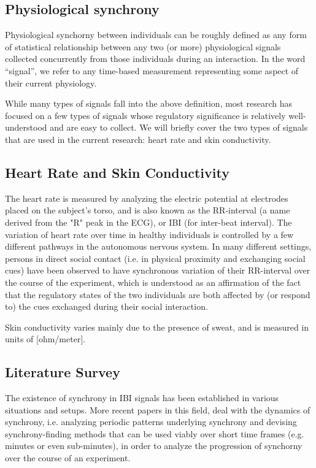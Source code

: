 \documentclass[a4paper, 11pt]{article}      %
\begin{document}
\subsection{Physiological synchrony}
Physiological synchorny between individuals can be roughly defined as any form of statistical relationship between any two (or more) physiological signals collected concurrently from those individuals during an interaction. In the word ``signal'', we refer to any time-based measurement representing some aspect of their current physiology.


While many types of signals fall into the above definition, most research has focused on a few types of signals whose regulatory significance is relatively well-understood and are easy to collect. We will briefly cover the two types of signals that are used in the current research: heart rate and skin conductivity.

\subsection{Heart Rate and Skin Conductivity}
The heart rate is measured by analyzing the electric potential at electrodes placed on the subject's torso, and is also known as the RR-interval (a name derived from the "R" peak in the ECG), or IBI (for inter-beat interval). The variation of heart rate over time in healthy individuals is controlled by a few different pathways in the autonomous nervous system. In many different settings, persons in direct social contact (i.e. in physical proximity and exchanging social cues) have been observed to have synchronous variation of their RR-interval over the course of the experiment, which is understood as an affirmation of the fact that the regulatory states of the two individuals are both affected by (or respond to) the cues exchanged during their social interaction.

Skin conductivity varies mainly due to the presence of sweat, and is measured in units of [ohm\slash meter].

\subsection{Literature Survey}
The existence of synchrony in IBI signals has been established in various situations and setups. More recent papers in this field, deal with the dynamics of synchrony, i.e. analyzing periodic patterns underlying synchrony and devising synchrony-finding methods that can be used viably over short time frames (e.g. minutes or even sub-minutes), in order to analyze the progression of synchorny over the course of an experiment. 
\end{document}
